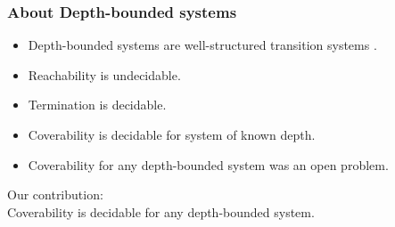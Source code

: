 \documentclass{beamer}
\begin{document}
\begin{frame}
  \frametitle{About Depth-bounded systems}
  \begin{itemize}
  \item Depth-bounded systems are well-structured transition systems \cite{Meyer08OnBoundednessInDepth}.
  \item Reachability is undecidable.
  \item Termination is decidable.
  \item Coverability is decidable for system of known depth.
  \item Coverability for any depth-bounded system was an open problem.
  \end{itemize}

  \vspace{10pt}

  Our contribution:\\
  Coverability is decidable for any depth-bounded system.

\end{frame}
\end{document}
